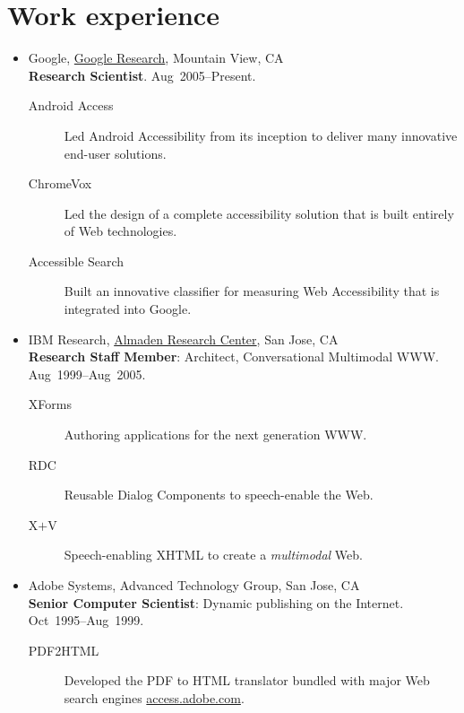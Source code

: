 \documentclass{article}
\begin{document}
\section*{Work experience}
\begin{itemize}
  \item {Google},
  \href{http://www.google.com/search?q=tv%2Braman}{Google Research}, Mountain View, CA\\
  \textbf{Research Scientist}.
\hfill Aug~2005--Present.
\begin{description}
\item[Android Access]  Led Android Accessibility from its
inception to deliver many innovative end-user solutions.
\item[ChromeVox]  Led the design of a  complete accessibility
solution that is built entirely of Web technologies.
\item[Accessible Search] Built an innovative classifier for
  measuring Web Accessibility  that is integrated into Google.
  
\end{description}

\item {IBM Research},
\href{http://www.almaden.ibm.com/cs/people/tvraman}{Almaden Research Center}, San Jose, CA\\
  \textbf{Research Staff Member}: Architect, Conversational
  Multimodal WWW\@. \hfill Aug~1999--Aug~2005.
\begin{description}
\item [XForms] Authoring applications for the next generation
  WWW.
\item [RDC] Reusable Dialog Components to speech-enable the Web.

\item[X$+$V] Speech-enabling XHTML to create a \emph{multimodal}
  Web.
\end{description}
\item   {Adobe Systems},  {Advanced Technology Group}, San Jose, CA\\
  \textbf{Senior Computer Scientist}: Dynamic publishing on the
  Internet.  \hfill Oct~1995--Aug~1999.
\begin{description}
\item[PDF2HTML] Developed the PDF to HTML translator bundled with
  major Web search engines \mdash
  \href{http://access.adobe.com}{access.adobe.com}.
  

\end{description}
\end{itemize}
\end{document}
